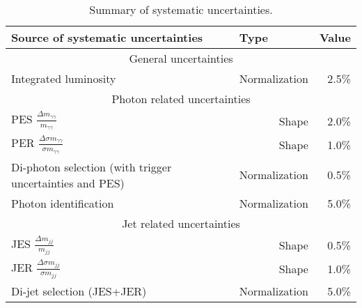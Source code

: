 \begin{table}[h] \small
\centering
\caption{Summary of systematic uncertainties.}
\label{tab:systematic}
\begin{tabular}{lrr}
\hline
\multicolumn{1}{l|}{Source of systematic uncertainties}                                   & \multicolumn{1}{l|}{Type}          & \multicolumn{1}{l}{Value} \\ \hline
\multicolumn{3}{c}{General uncertainties}                                                                                                                  \\ \hline
\multicolumn{1}{l|}{Integrated luminosity}                                                & \multicolumn{1}{r|}{Normalization} & 2.5\%                     \\ \hline
\multicolumn{3}{c}{Photon related uncertainties}                                                                                                           \\ \hline
\multicolumn{1}{l|}{PES $\frac{\Delta m_{\gamma\gamma}}{m_{\gamma\gamma}}$}               & \multicolumn{1}{r|}{Shape}         & 2.0\%                     \\ \cline{2-2}
\multicolumn{1}{l|}{PER $\frac{\Delta \sigma m_{\gamma\gamma}}{\sigma m_{\gamma\gamma}}$} & \multicolumn{1}{r|}{Shape}         & 1.0\%                     \\ \cline{2-2}
\multicolumn{1}{l|}{Di-photon selection (with trigger uncertainties and PES)}              & \multicolumn{1}{r|}{Normalization} & 0.5\%                     \\ \cline{2-2}
\multicolumn{1}{l|}{Photon identification}                                                 & \multicolumn{1}{r|}{Normalization} & 5.0\%                     \\ \hline
\multicolumn{3}{c}{Jet related uncertainties}                                                                                                              \\ \hline
\multicolumn{1}{l|}{JES $\frac{\Delta m_{jj}}{m_{jj}}$}                                   & \multicolumn{1}{r|}{Shape}         & 0.5\%                     \\ \cline{2-2}
\multicolumn{1}{l|}{JER $\frac{\Delta \sigma m_{jj}}{\sigma m_{jj}}$}                     & \multicolumn{1}{r|}{Shape}         & 1.0\%                     \\ \cline{2-2}
\multicolumn{1}{l|}{Di-jet selection (JES+JER)}                                            & \multicolumn{1}{r|}{Normalization} & 5.0\%                     \\ \hline

\end{tabular}
\end{table}

